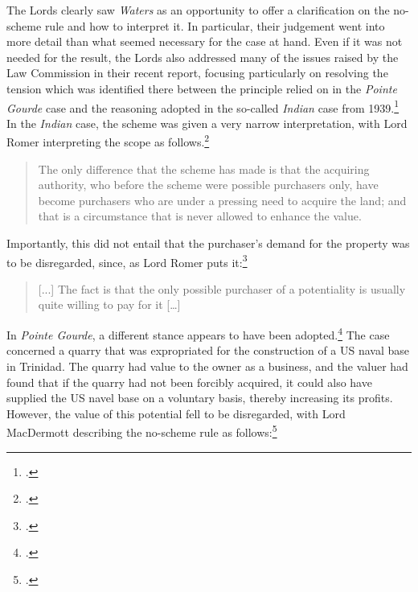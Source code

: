 The Lords clearly saw \emph{Waters} as an opportunity to offer a clarification on the no-scheme rule and how to interpret it. In particular, their judgement went into more detail than what seemed necessary for the case at hand. Even if it was not needed for the result, the Lords also addressed many of the issues raised by the Law Commission in their recent report, focusing particularly on resolving the tension which was identified there between the principle relied on in the \emph{Pointe Gourde} case and the reasoning adopted in the so-called \emph{Indian} case from 1939.\footnote{\cite{indian39,gourde47}.} In the \emph{Indian} case, the scheme was given a very narrow interpretation, with Lord Romer interpreting the scope as follows.\footcite[319]{indian39}

\begin{quote}
The only difference that the scheme has made is that the acquiring
authority, who before the scheme were possible purchasers only, have
become purchasers who are under a pressing need to acquire the
land; and that is a circumstance that is never allowed to enhance the
value.
\end{quote}

Importantly, this did not entail that the purchaser's demand for the property was to be disregarded, since, as Lord Romer puts it:\footcite[316-317]{indian39}

\begin{quote}
[...] The fact is that the only possible purchaser of a potentiality is
usually quite willing to pay for it […]
\end{quote}

In \emph{Pointe Gourde}, a different stance appears to have been adopted.\footcite{gourde47} The case concerned a quarry that was expropriated for the construction of a US naval base in Trinidad. The quarry had value to the owner as a business, and the valuer had found that if the quarry had not been forcibly acquired, it could also have supplied the US navel base on a voluntary basis, thereby increasing its profits. However, the value of this potential fell to be disregarded, with Lord MacDermott describing the no-scheme rule as follows:\footcite[572]{gourde47}

